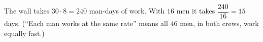 The wall takes $30\cdot8=240$ man-days of work. With $16$ men it takes $\dfrac{240}{16}=\boxed{15}$ days. (``Each man works at the same rate'' means all $46$ men, in both crews, work equally fast.)
